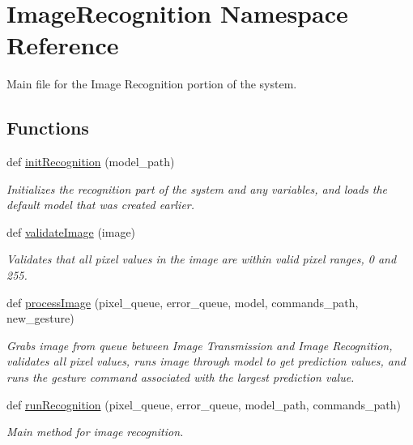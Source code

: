 \hypertarget{namespaceImageRecognition}{}\section{Image\+Recognition Namespace Reference}
\label{namespaceImageRecognition}


Main file for the Image Recognition portion of the system.  


\subsection*{Functions}
\begin{DoxyCompactItemize}
\item 
def \hyperlink{namespaceImageRecognition_ae839052fe2fa16ffa7804966c331f792}{init\+Recognition} (model\+\_\+path)
\begin{DoxyCompactList}\small\item\em Initializes the recognition part of the system and any variables, and loads the default model that was created earlier. \end{DoxyCompactList}\item 
def \hyperlink{namespaceImageRecognition_a29b55a32880e0e8ab9e35c25094e75c4}{validate\+Image} (image)
\begin{DoxyCompactList}\small\item\em Validates that all pixel values in the image are within valid pixel ranges, 0 and 255. \end{DoxyCompactList}\item 
def \hyperlink{namespaceImageRecognition_af3a8ad13ef194bb7126f55c31eaa06db}{process\+Image} (pixel\+\_\+queue, error\+\_\+queue, model, commands\+\_\+path, new\+\_\+gesture)
\begin{DoxyCompactList}\small\item\em Grabs image from queue between Image Transmission and Image Recognition, validates all pixel values, runs image through model to get prediction values, and runs the gesture command associated with the largest prediction value. \end{DoxyCompactList}\item 
def \hyperlink{namespaceImageRecognition_a9709415793e740c3fb251cd22e053c17}{run\+Recognition} (pixel\+\_\+queue, error\+\_\+queue, model\+\_\+path, commands\+\_\+path)
\begin{DoxyCompactList}\small\item\em Main method for image recognition. \end{DoxyCompactList}\end{DoxyCompactItemize}
